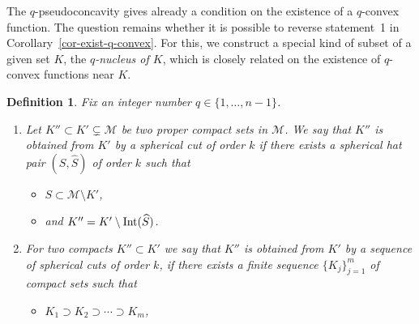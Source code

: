 \documentclass[11pt,a4paper]{article}
\newtheorem{defn}[lem]{Definition}
\renewcommand{\SS}{\mathbb{S}}
\newcommand{\Mcal}{\mathcal{M}}
\newcommand{\Int}{\hbox{Int}}
\begin{document}
The $q$-pseudoconcavity gives already a condition on the existence of a $q$-convex function. The question remains whether it is possible to reverse statement~1 in Corollary~\ref{cor-exist-q-convex}. For this, we construct a special kind of subset of a given set $K$, the \emph{$q$-nucleus of $K$}, which is closely related on the existence of $q$-convex functions near $K$.


\begin{defn}\label{def-q-nucleus} Fix an integer number $q\in\{1,\ldots,n-1\}$. 

\begin{enumerate}

\item Let $K''\subset K'\subsetneq\Mcal$ be two proper compact sets in $\Mcal$. We say that $K''$ \emph{is obtained from $K'$ by a spherical cut of order $k$} if there exists a spherical hat pair $(S,\widehat{S})$ of order $k$ such that

\begin{itemize}

\item $S \subset \Mcal\setminus K'$,

\item and $K''=K' \setminus \Int(\widehat{S})$.

\end{itemize}


\item For two compacts $K''\subset K'$ we say that \emph{$K''$ is obtained from $K'$ by a sequence of spherical cuts of order $k$}, if there exists a finite sequence $\{K_j\}_{j=1}^m$ of compact sets such that

\begin{itemize}

\item $K_1 \supset K_2 \supset \cdots \supset K_m$,


\end{itemize}
\end{enumerate}
\end{defn}
\end{document}
